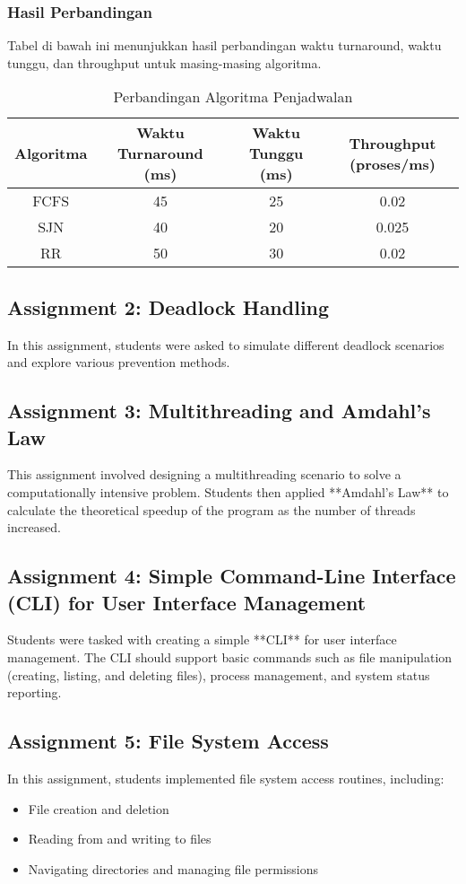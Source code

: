 \documentclass[12pt]{article}
\begin{document}
\begin{itemiz;[e}
\subsubsection{Hasil Perbandingan}

Tabel di bawah ini menunjukkan hasil perbandingan waktu turnaround, waktu tunggu, dan throughput untuk masing-masing algoritma.

\begin{table}[htbp]
    \centering
    \begin{tabular}{|c|c|c|c|}
    \hline
    \textbf{Algoritma} & \textbf{Waktu Turnaround (ms)} & \textbf{Waktu Tunggu (ms)} & \textbf{Throughput (proses/ms)} \\
    \hline
    FCFS & 45 & 25 & 0.02 \\
    \hline
    SJN & 40 & 20 & 0.025 \\
    \hline
    RR & 50 & 30 & 0.02 \\
    \hline
    \end{tabular}
    \caption{Perbandingan Algoritma Penjadwalan}
    \label{tab:comparison}
\end{table}

\subsection{Assignment 2: Deadlock Handling}
In this assignment, students were asked to simulate different deadlock scenarios and explore various prevention methods.

\subsection{Assignment 3: Multithreading and Amdahl's Law}
This assignment involved designing a multithreading scenario to solve a computationally intensive problem. Students then applied **Amdahl's Law** to calculate the theoretical speedup of the program as the number of threads increased.

\subsection{Assignment 4: Simple Command-Line Interface (CLI) for User Interface Management}
Students were tasked with creating a simple **CLI** for user interface management. The CLI should support basic commands such as file manipulation (creating, listing, and deleting files), process management, and system status reporting.

\subsection{Assignment 5: File System Access}
In this assignment, students implemented file system access routines, including:
\begin{itemize}
    \item File creation and deletion
    \item Reading from and writing to files
    \item Navigating directories and managing file permissions
\end{itemize}


\end{itemiz;[e}
\end{document}
